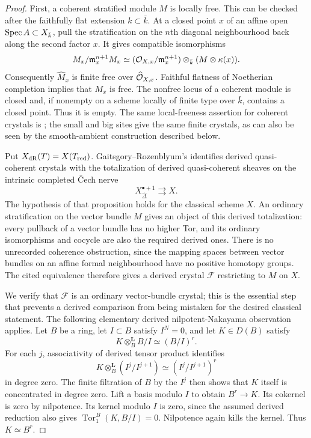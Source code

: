 \begin{proof}
First, a coherent stratified module $M$ is locally free.  This can be checked after the faithfully flat extension $k\subset\bar k$.  At a closed point $x$ of an affine open $\operatorname{Spec} A\subset X_{\bar k}$, pull the stratification on the $n$th diagonal neighbourhood back along the second factor $x$.  It gives compatible isomorphisms
\[
 M_x/\mathfrak m_x^{n+1}M_x
  \simeq (\mathcal O_{X,x}/\mathfrak m_x^{n+1})
                  \otimes_{\bar k}(M\otimes\kappa(x)).
\]
Consequently $\widehat M_x$ is finite free over $\widehat{\mathcal O}_{X,x}$.  Faithful flatness of Noetherian completion implies that $M_x$ is free.  The nonfree locus of a coherent module is closed and, if nonempty on a scheme locally of finite type over $\bar k$, contains a closed point.  Thus it is empty.  The same local-freeness assertion for coherent crystals is \cite[Theorem~6.8(4), with Axiom~A of~5.2]{ToniniZhang2019}; the small and big sites give the same finite crystals, as can also be seen by the smooth-ambient construction described below.

Put $X_{\mathrm{dR}}(T)=X(T_{\rm red})$.  Gaitsgory--Rozenblyum's \cite[Proposition~3.4.3]{GaitsgoryRozenblyum2014} identifies derived quasi-coherent crystals with the totalization of derived quasi-coherent sheaves on the intrinsic completed \v Cech nerve
\[
             X^{\bullet+1}_{\widehat\Delta}
                      \rightrightarrows X .
\]
The hypothesis of that proposition holds for the classical scheme $X$.  An ordinary stratification on the vector bundle $M$ gives an object of this derived totalization: every pullback of a vector bundle has no higher Tor, and its ordinary isomorphisms and cocycle are also the required derived ones.  There is no unrecorded coherence obstruction, since the mapping spaces between vector bundles on an affine formal neighbourhood have no positive homotopy groups.  The cited equivalence therefore gives a derived crystal $\mathcal F$ restricting to $M$ on $X$.

We verify that $\mathcal F$ is an ordinary vector-bundle crystal; this is the essential step that prevents a derived comparison from being mistaken for the desired classical statement.  The following elementary derived nilpotent-Nakayama observation applies.  Let $B$ be a ring, let $I\subset B$ satisfy $I^N=0$, and let $K\in D(B)$ satisfy
\[
                        K\otimes_B^{\mathbf L}B/I\simeq(B/I)^r.
\]
For each $j$, associativity of derived tensor product identifies
\[
 K\otimes_B^{\mathbf L}(I^j/I^{j+1})
      \simeq (I^j/I^{j+1})^r
\]
in degree zero.  The finite filtration of $B$ by the $I^j$ then shows that $K$ itself is concentrated in degree zero.  Lift a basis modulo $I$ to obtain $B^r\to K$.  Its cokernel is zero by nilpotence.  Its kernel modulo $I$ is zero, since the assumed derived reduction also gives $\operatorname{Tor}_1^B(K,B/I)=0$.  Nilpotence again kills the kernel.  Thus $K\simeq B^r$.


\end{proof}
